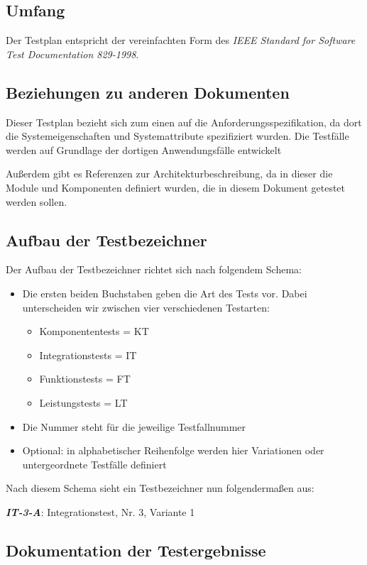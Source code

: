 \documentclass[fontsize=12pt,paper=a4,twoside]{scrartcl}
\begin{document}
\subsection{Umfang}
Der Testplan entspricht der vereinfachten Form des \emph{IEEE Standard for Software Test Documentation 829-1998}. 

\subsection{Beziehungen zu anderen Dokumenten}
Dieser Testplan bezieht sich zum einen auf die Anforderungsspezifikation, da dort die Systemeigenschaften und Systemattribute spezifiziert wurden. Die Testfälle werden auf Grundlage der dortigen Anwendungsfälle entwickelt

Außerdem gibt es Referenzen zur Architekturbeschreibung, da in dieser die Module und Komponenten definiert wurden, die in diesem Dokument getestet werden sollen.


\subsection{Aufbau der Testbezeichner}
\label{sec:aufb-der-testb}

Der Aufbau der Testbezeichner richtet sich nach folgendem Schema:
\begin{itemize}
\item Die ersten beiden Buchstaben geben die Art des Tests vor. Dabei unterscheiden wir zwischen vier verschiedenen Testarten:
\begin{itemize}
	\item Komponententests = KT
	\item Integrationstests = IT
	\item Funktionstests = FT
	\item Leistungstests = LT
\end{itemize}
\item Die Nummer steht für die jeweilige Testfallnummer

\item Optional: in alphabetischer Reihenfolge werden hier Variationen oder untergeordnete Testfälle definiert
\end{itemize}
Nach diesem Schema sieht ein Testbezeichner nun folgendermaßen aus:

\textbf{\emph{IT-3-A}}: Integrationstest, Nr. 3, Variante 1

\subsection{Dokumentation der Testergebnisse}
\end{document}
